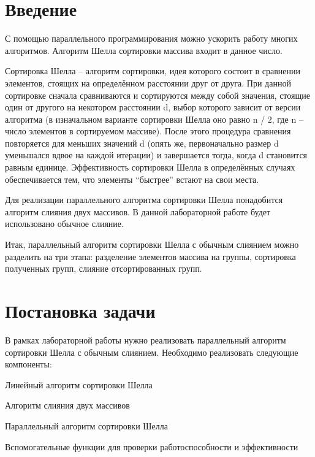 \documentclass{report}
\begin{document}
\setcounter{page}{2}

\newpage

\section*{Введение}
С помощью параллельного программирования можно ускорить работу многих алгоритмов. Алгоритм Шелла сортировки массива входит в данное число.
\par
Сортировка Шелла – алгоритм сортировки, идея которого состоит в сравнении элементов, стоящих на определённом расстоянии друг от друга. При данной сортировке сначала сравниваются и сортируются между собой значения, стоящие один от другого на некотором расстоянии d, выбор которого зависит от версии алгоритма (в изначальном варианте сортировки Шелла оно равно n / 2, где n – число элементов в сортируемом массиве). После этого процедура сравнения повторяется для меньших значений d (опять же, первоначально размер d уменьшался вдвое на каждой итерации) и завершается тогда, когда d становится равным единице. Эффективность сортировки Шелла в определённых случаях обеспечивается тем, что элементы “быстрее” встают на свои места.
\par
Для реализации параллельного алгоритма сортировки Шелла понадобится алгоритм слияния двух массивов. В данной лабораторной работе будет использовано обычное  слияние.
\par
Итак, параллельный алгоритм сортировки Шелла с обычным слиянием можно разделить на три этапа: разделение элементов массива на группы, сортировка полученных групп, слияние отсортированных групп.
\newpage

\section*{Постановка задачи}
В	рамках	лабораторной	работы	нужно	реализовать	параллельный	алгоритм сортировки Шелла с обычным слиянием. Необходимо реализовать следующие компоненты:
\par
Линейный алгоритм сортировки Шелла
\par
Алгоритм слияния двух массивов
\par
Параллельный алгоритм сортировки Шелла
\par
Вспомогательные функции для проверки работоспособности и эффективности
\newpage

\end{document}
